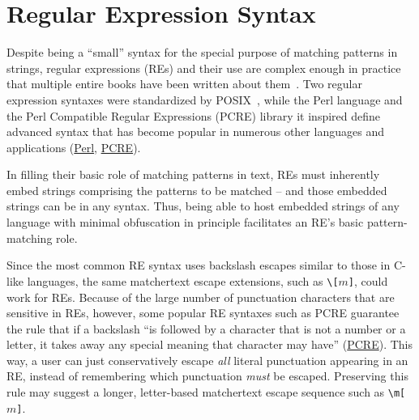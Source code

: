 \section{Regular Expression Syntax}
\label{app:regex}

Despite being a ``small'' syntax for the special purpose
of matching patterns in strings,
regular expressions (REs) and their use are complex enough in practice
that multiple entire books have been written
about them~\cite{fitzgerald12introducing,friedl06mastering,goyvaerts12regular}.
Two regular expression syntaxes were standardized
by POSIX~\cite{ieee17posix},
while the Perl language and the
Perl Compatible Regular Expressions (PCRE) library
it inspired
define advanced syntax that has become popular
in numerous other languages and applications
(\href{https://www.perl.org}{Perl}, \href{https://www.pcre.org}{PCRE}).

In filling their basic role of matching patterns in text,
REs must inherently embed strings
comprising the patterns to be matched --
and those embedded strings can be in any syntax.
Thus, being able to host embedded strings of any language
with minimal obfuscation
in principle facilitates an RE's basic pattern-matching role.

Since the most common RE syntax uses backslash escapes
similar to those in C-like languages,
the same matchertext escape extensions,
such as \verb|\[|$m$\verb|]|, could work for REs.
Because of the large number of punctuation characters
that are sensitive in REs, however,
some popular RE syntaxes such as
PCRE
guarantee the rule that if a backslash
``is followed by a character that is not a number or a letter,
it takes away any special meaning that character may have''
(\href{https://www.pcre.org/original/doc/html/pcrepattern.html}{PCRE}).
This way, a user can just conservatively
escape \emph{all} literal punctuation appearing in an RE,
instead of remembering which punctuation \emph{must} be escaped.
Preserving this rule may suggest a longer, letter-based
matchertext escape sequence
such as \verb|\m[|$m$\verb|]|.

